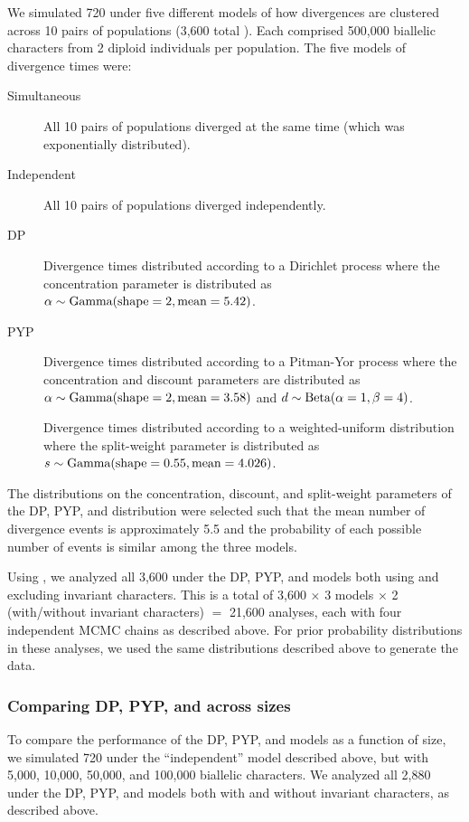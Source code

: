 \documentclass[letterpaper,12pt]{article}
\begin{document}
We simulated 720 \datasets under five different models of how divergences are
clustered across 10 pairs of populations (3,600 total \datasets).
Each \dataset comprised 500,000 biallelic characters from 2 diploid individuals
per population.
The five models of divergence times were:
\begin{description}
    \item[Simultaneous] All 10 pairs of populations diverged at the same time
        (which was exponentially distributed).
    \item[Independent] All 10 pairs of populations diverged independently.
    \item[DP] Divergence times distributed according to a Dirichlet process
        where the concentration parameter is distributed as
        $\alpha \sim \textrm{Gamma}(\textrm{shape} = 2, \textrm{mean} = 5.42)$.
    \item[PYP] Divergence times distributed according to a Pitman-Yor process
        where the concentration and discount parameters are distributed as
        $\alpha \sim \textrm{Gamma}(\textrm{shape} = 2, \textrm{mean} = 3.58)$
        and
        $d \sim \textrm{Beta}(\alpha = 1, \beta = 4)$.
    \item[\wunif] Divergence times distributed according to a
        weighted-uniform distribution
        where the split-weight parameter is distributed as
        $s \sim \textrm{Gamma}(\textrm{shape} = 0.55, \textrm{mean} = 4.026)$.
\end{description}
The distributions on the concentration, discount, and split-weight parameters of
the DP, PYP, and \wunif distribution were selected such that the mean number of
divergence events is approximately 5.5
and the probability of each possible number of events
is similar among the three models.

Using \ecoevolity, we analyzed all 3,600 \datasets under the
DP, PYP, and \wunif models both using and excluding invariant characters.
This is a total of
3,600 \datasets $\times$ 3 models $\times$ 2 (with/without invariant characters) $=$ 21,600
analyses, each with four independent MCMC chains as described above.
For prior probability distributions in these analyses,
we used the same distributions described above to generate the data.


\subsubsection{Comparing DP, PYP, and \wunif across \dataset sizes}

To compare the performance of the DP, PYP, and \wunif models as a function of
\dataset size, we simulated 720
\datasets under the ``independent'' model described above, but
with 5,000, 10,000, 50,000, and 100,000 biallelic characters.
We analyzed all 2,880 \datasets under the DP, PYP, and \wunif models
both with and without invariant characters, as
described above.
\end{document}
